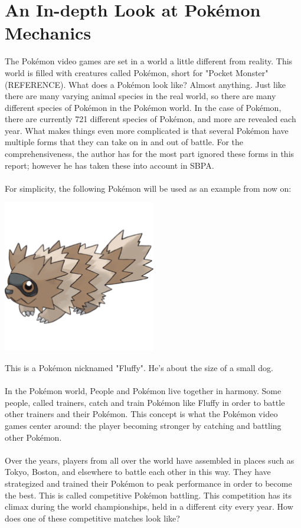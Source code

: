 \documentclass{article}
\begin{document}
\section{An In-depth Look at Pok\'emon Mechanics}
The Pok\'emon video games are set in a world a little different from reality. This world is filled with creatures called Pok\'emon, short for "Pocket Monster" (REFERENCE). What does a Pok\'emon look like? Almost anything. Just like there are many varying animal species in the real world, so there are many different species of Pok\'emon in the Pok\'emon world. In the case of Pok\'emon, there are currently 721 different species of Pok\'emon, and more are revealed each year. What makes things even more complicated is that several Pok\'emon have multiple forms that they can take on in and out of battle. For the comprehensiveness, the author has for the most part ignored these forms in this report; however he has taken these into account in SBPA.\\\\
For simplicity, the following Pok\'emon will be used as an example from now on:
\begin{center}
	\includegraphics[width=0.5\textwidth]{fluffy.png}
\end{center}
This is a Pok\'emon nicknamed "Fluffy". He's about the size of a small dog.\\\\
In the Pok\'emon world, People and Pok\'emon live together in harmony. Some people, called trainers, catch and train Pok\'emon like Fluffy in order to battle other trainers and their Pok\'emon. This concept is what the Pok\'emon video games center around: the player becoming stronger by catching and battling other Pok\'emon.\\\\
Over the years, players from all over the world have assembled in places such as Tokyo, Boston, and elsewhere to battle each other in this way. They have strategized and trained their Pok\'emon to peak performance in order to become the best. This is called competitive Pok\'emon battling. This competition has its climax during the world championships, held in a different city every year. How does one of these competitive matches look like?
\end{document}
